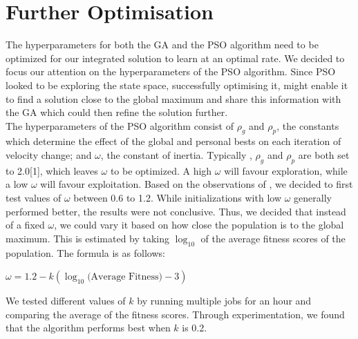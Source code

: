 \documentclass[12pt]{article}
\begin{document}
	\vspace{-0.3cm}
	\section{Further Optimisation}
	\vspace{-0.2cm}
	The hyperparameters for both the GA and the PSO algorithm need
	to be optimized for our integrated solution to learn at an optimal rate.
	We decided to focus our attention on the hyperparameters
	of the PSO algorithm. Since PSO looked to be exploring the state space, successfully
	optimising it, might enable it to find a solution close to the global
	maximum and share this information with the GA which could then refine the solution further.\\

	The hyperparameters of the PSO algorithm consist of $\rho_g$ and $\rho_p$, the constants
	which determine the effect of the global and personal bests on each iteration
	of velocity change; and $\omega$, the constant of inertia. Typically \cite{alam2015comparative}, $\rho_g$ and $\rho_p$ are both
	set to 2.0[1], which leaves $\omega$ to be optimized. A high $\omega$ will favour exploration,
	while a low $\omega$ will favour exploitation. Based on the observations of
	\cite{shi1998parameter}, we decided to first test values of $\omega$ between 0.6 to 1.2.
	While initializations with low $\omega$ generally performed better, the results were
	not conclusive. Thus, we decided that instead of a fixed $\omega$, we could vary it
	based on how close the population is to the global maximum. This is estimated
	by taking $\log_{10}$ of the average fitness scores of the population. The formula is as follows:

	\begin{center}
		$\omega = 1.2 - k(\log_{10}\text{(Average Fitness)} - 3)$
	\end{center}

	We tested different values of $k$ by running multiple jobs for an hour and comparing
 	the average of the fitness scores. Through experimentation, we found that the
	algorithm performs best when $k$ is 0.2.\\


\end{document}
